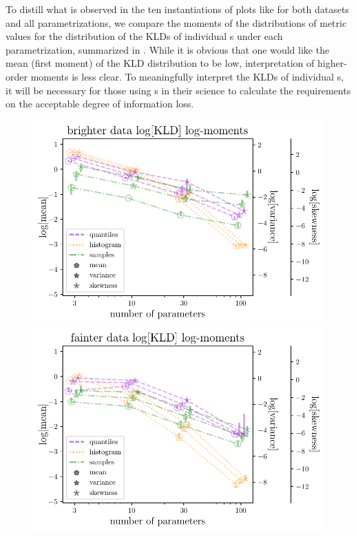 To distill what is observed in the ten instantiations of plots like 
 for both datasets and all parametrizations, we 
compare the moments of the distributions of metric values for the distribution 
of the KLDs of individual \pz s under each parametrization, summarized in 
.
While it is obvious that one would like the mean (first moment) of the KLD 
distribution to be low, interpretation of higher-order moments is less clear.
To meaningfully interpret the KLDs of individual \pz s, it will be necessary 
for those using \pz s in their science to calculate the requirements on the 
acceptable degree of information loss.
\begin{figure}
	\begin{center}
		\includegraphics[width=\columnwidth]{figures/qp/graham_pz_kld.pdf}
		\includegraphics[width=\columnwidth]{figures/qp/schmidt_pz_kld.pdf}

\end{center}
\end{figure}
